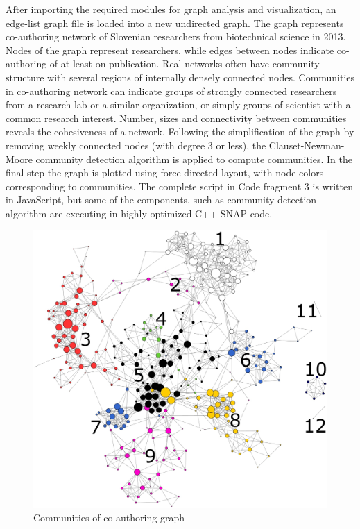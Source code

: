 \documentclass{article} %
\begin{document}
After importing the required modules for graph analysis and visualization, an edge-list graph file is loaded into a new undirected graph. The graph represents co-authoring network of Slovenian researchers from biotechnical science in 2013. Nodes of the graph represent researchers, while edges between nodes indicate co-authoring of at least on publication. Real networks often have community structure with several regions of internally densely connected nodes. Communities in co-authoring network can indicate groups of strongly connected researchers from a research lab or a similar organization, or simply groups of scientist with a common research interest. Number, sizes and connectivity between communities reveals the cohesiveness of a network. Following the simplification of the graph by removing weekly connected nodes (with degree 3 or less), the Clauset-Newman-Moore \cite{clauset-newman-moore} community detection algorithm is applied to compute communities. In the final step the graph is plotted using force-directed layout, with node colors corresponding to communities. The complete script in Code fragment 3 is written in JavaScript, but some of the components, such as community detection algorithm are executing in highly optimized C++ SNAP code.
\begin{figure}[h]
\begin{center}
\includegraphics[scale=0.25]{communities_labeled.jpg}
\caption{Communities of co-authoring graph}
\end{center}
\end{figure}
\end{document}
